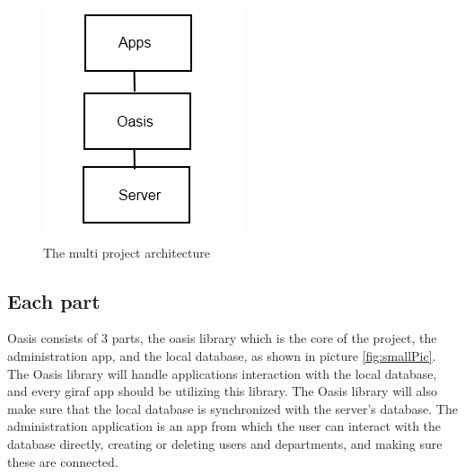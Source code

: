 \begin{figure}
	\centering
		\includegraphics[width=\textwidth]{images/BigPicture.jpg}
	\caption{The multi project architecture}
	\label{fig:bigpic}
\end{figure}

\subsection{Each part}
Oasis consists of 3 parts, the oasis library which is the core of the project, the administration app, and the local database, as shown in picture \vref{fig:smallPic}. The Oasis library will handle applications interaction with the local database, and every giraf app should be utilizing this library. The Oasis library will also make sure that the local database is synchronized with the server's database.
The administration application is an app from which the user can interact with the database directly, creating or deleting users and departments, and making sure these are connected.

